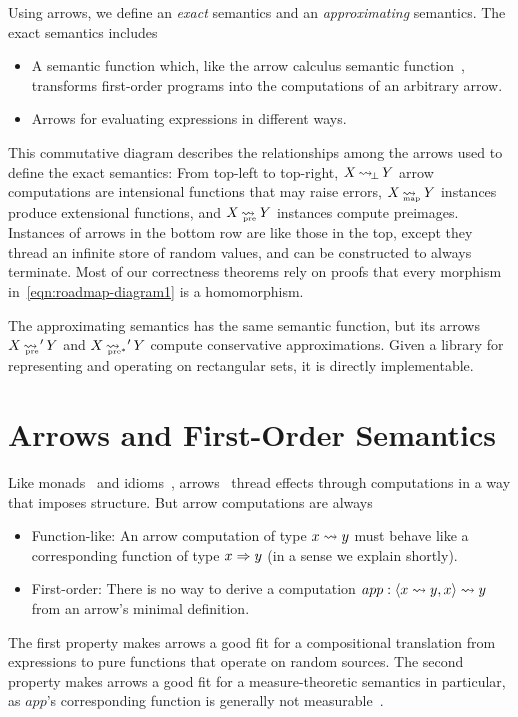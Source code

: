 Using arrows, we define an \emph{exact} semantics and an \emph{approximating} semantics.
The exact semantics includes
\begin{itemize}
	\item A semantic function which, like the arrow calculus semantic function~\cite{cit:lindley-2010jfp-arrow-calculus}, transforms first-order programs into the computations of an arbitrary arrow.
	\item Arrows for evaluating expressions in different ways.
\end{itemize}
This commutative diagram describes the relationships among the arrows used to define the exact semantics:
From top-left to top-right, $X \operatorname{\rightsquigarrow_{\mspace{-3mu}\bot}} Y$ arrow computations are intensional functions that may raise errors, $X \operatorname{\rightsquigarrow_{\mspace{-21mu}_\mathrm{map}}} Y$ instances produce extensional functions, and $X \operatorname{\rightsquigarrow_{\mspace{-19mu}_\mathrm{pre}}} Y$ instances compute preimages.
Instances of arrows in the bottom row are like those in the top, except they thread an infinite store of random values, and can be constructed to always terminate.
Most of our correctness theorems rely on proofs that every morphism in~\eqref{eqn:roadmap-diagram1} is a homomorphism.

The approximating semantics has the same semantic function, but its arrows $X \operatorname{\rightsquigarrow_{\mspace{-19mu}_\mathrm{pre}}}' Y$ and $X \operatorname{\rightsquigarrow_{\mspace{-19mu}_{\mathrm{pre*}}}}' Y$ compute conservative approximations.
Given a library for representing and operating on rectangular sets, it is directly implementable.


\section{Arrows and First-Order Semantics}

Like monads~\cite{cit:wadler-2001-monads} and idioms~\cite{cit:mcbride-2008jfp-idiom}, arrows~\cite{cit:hughes-2000scp-arrows} thread effects through computations in a way that imposes structure.
But arrow computations are always
\begin{itemize}
	\item Function-like: An arrow computation of type $x \rightsquigarrow y$ must behave like a corresponding function of type $x \Rightarrow y$ (in a sense we explain shortly).
	\item First-order: There is no way to derive a computation $app : \langle{x \rightsquigarrow y, x}\rangle \rightsquigarrow y$ from an arrow's minimal definition.
\end{itemize}
The first property makes arrows a good fit for a compositional translation from expressions to pure functions that operate on random sources.
The second property makes arrows a good fit for a measure-theoretic semantics in particular, as $app$'s corresponding function is generally not measurable~\cite{cit:aumann-1961ijm-borel}.

